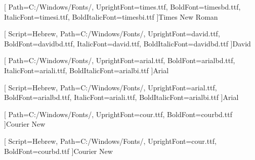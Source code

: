 
\usepackage{geometry}
\geometry{
  a4paper,
  top=2.5cm,
  bottom=2.5cm,
  inner=3.0cm,   %
  outer=2.5cm,
  headheight=16pt
}

\usepackage{amsmath,amssymb,amsfonts}

\usepackage[bidi=basic,provide=*,shorthands=off]{babel}
\usepackage{fontspec}

[
  Path=C:/Windows/Fonts/,
  UprightFont=times.ttf,
  BoldFont=timesbd.ttf,
  ItalicFont=timesi.ttf,
  BoldItalicFont=timesbi.ttf
]{Times New Roman}

[
  Script=Hebrew,
  Path=C:/Windows/Fonts/,
  UprightFont=david.ttf,
  BoldFont=davidbd.ttf,
  ItalicFont=david.ttf,
  BoldItalicFont=davidbd.ttf
]{David}

[
  Path=C:/Windows/Fonts/,
  UprightFont=arial.ttf,
  BoldFont=arialbd.ttf,
  ItalicFont=ariali.ttf,
  BoldItalicFont=arialbi.ttf
]{Arial}

[
  Script=Hebrew,
  Path=C:/Windows/Fonts/,
  UprightFont=arial.ttf,
  BoldFont=arialbd.ttf,
  ItalicFont=ariali.ttf,
  BoldItalicFont=arialbi.ttf
]{Arial}

[
  Path=C:/Windows/Fonts/,
  UprightFont=cour.ttf,
  BoldFont=courbd.ttf
]{Courier New}

[
  Script=Hebrew,
  Path=C:/Windows/Fonts/,
  UprightFont=cour.ttf,
  BoldFont=courbd.ttf
]{Courier New}

\newcommand{\hebrewfont}{\rmfamily}
\newcommand{\hebrewfontsf}{\sffamily}
\newcommand{\hebrewfonttt}{\ttfamily}
\newcommand{\englishfont}{\rmfamily}
\newcommand{\englishfontsf}{\sffamily}
\newcommand{\englishfonttt}{\ttfamily}

\providecommand{\texthebrew}[1]{\ifmmode\mbox{\foreignlanguage{hebrew}{#1}}\else\foreignlanguage{hebrew}{#1}\fi}
\providecommand{\textenglish}[1]{\ifmmode\mathrm{#1}\else\foreignlanguage{english}{#1}\fi}
\newenvironment{hebrew}{\begin{otherlanguage}{hebrew}}{\end{otherlanguage}}
\newenvironment{english}{\begin{otherlanguage}{english}}{\end{otherlanguage}}

